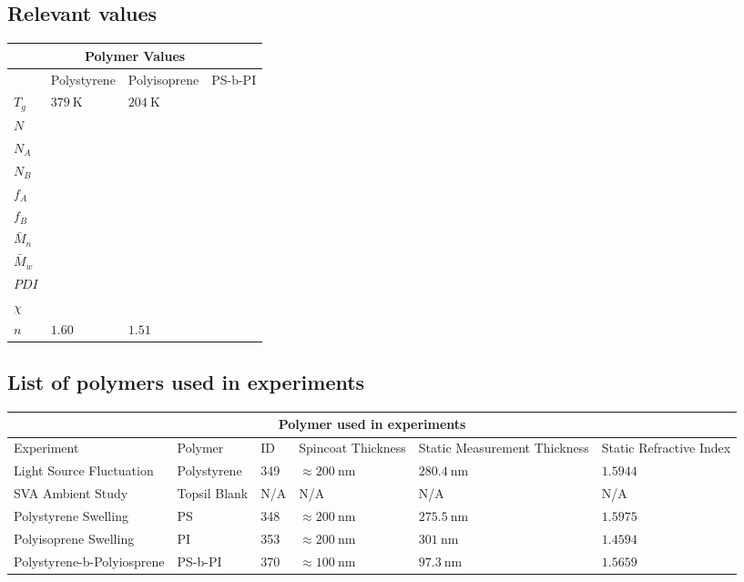 \documentclass[MasterThesisMain.tex]{subfiles}
\begin{document}
\subsection{Relevant values}

\begin{tabular}{ |p{3cm}||p{3cm}|p{3cm}|p{3cm}|  }
 \hline
 \multicolumn{4}{|c|}{Polymer Values} \\
 \hline
    & Polystyrene & Polyisoprene & PS-b-PI\\
 \hline
 $T_g$& $\SI{379}{\kelvin}$   & $\SI{204}{\kelvin}$  &   \\
 $N$&  &  &  \\
 $N_A$&  &  &  \\
 $N_B$&  &  &  \\
 $f_A$&  &  &  \\
 $f_B$&  &  &  \\
 $\bar{M}_n$&  &  &  \\
 $\bar{M}_w$&  &  &  \\
 $PDI$&  &  &  \\
 $\chi$&  &  &  \\
 $n$& $1.60$ & $1.51$ &\\
 \hline
\end{tabular}

\subsection{List of polymers used in experiments}

\begin{tabular}{ |p{3cm}||p{2cm}|p{2cm}|p{2cm}|p{2cm}|p{2cm}|  }
 \hline
 \multicolumn{6}{|c|}{Polymer used in experiments} \\
 \hline
 Experiment & Polymer & ID & Spincoat Thickness & Static Measurement Thickness & Static Refractive Index\\
 \hline
 Light Source Fluctuation & Polystyrene & 349 & $\approx\SI{200}{\nano\meter}$ & $\SI{280.4}{\nano\meter}$ & $1.5944$  \\
 SVA Ambient Study & Topsil Blank & N/A & N/A & N/A & N/A  \\
 Polystyrene Swelling & PS  & 348  & $\approx\SI{200}{\nano\meter}$ & $\SI{275.5}{\nano\meter}$ & $1.5975$  \\
 Polyisoprene Swelling & PI  & 353 & $\approx\SI{200}{\nano\meter}$ & $\SI{301}{\nano\meter}$ & $1.4594$  \\
 Polystyrene-b-Polyiosprene & PS-b-PI & 370 & $\approx\SI{100}{\nano\meter}$ & $\SI{97.3}{\nano\meter}$ & $1.5659$  \\
 \hline
\end{tabular}
\end{document}
